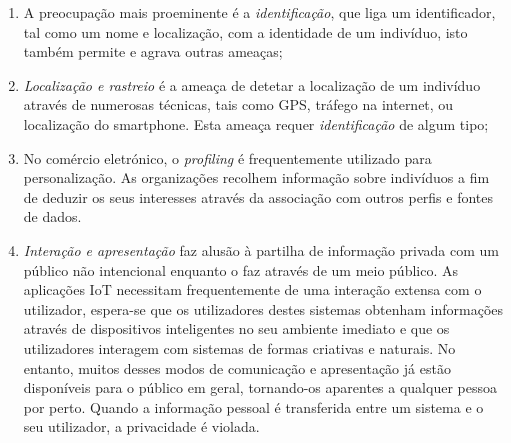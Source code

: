 \documentclass[conference]{IEEEtran}
\begin{document}
\begin{enumerate}
    \item
    A preocupação mais proeminente é a \textit{identificação}, que liga
    um identificador, tal como um nome e localização, com a identidade de
    um indivíduo, isto também permite e agrava outras ameaças;

    \item
    \textit{Localização e rastreio} é a ameaça de detetar a localização
    de um indivíduo através de numerosas técnicas, tais como GPS, tráfego
    na internet, ou localização do smartphone. Esta ameaça requer \textit{identificação}
    de algum tipo;

    \item
    No comércio eletrónico, o \textit{profiling} é frequentemente utilizado
    para personalização. As organizações recolhem informação sobre indivíduos
    a fim de deduzir os seus interesses através da associação com outros
    perfis e fontes de dados.

    \item
    \textit{Interação e apresentação} faz alusão à partilha de informação
    privada com um público não intencional enquanto o faz através de um
    meio público. As aplicações IoT necessitam frequentemente de uma interação
    extensa com o utilizador, espera-se que os utilizadores destes sistemas
    obtenham informações através de dispositivos inteligentes no seu ambiente
    imediato e que os utilizadores interagem com sistemas de formas criativas
    e naturais. No entanto, muitos desses modos de comunicação e apresentação
    já estão disponíveis para o público em geral, tornando-os aparentes
    a qualquer pessoa por perto. Quando a informação pessoal é transferida
    entre um sistema e o seu utilizador, a privacidade é violada.


\end{enumerate}
\end{document}
